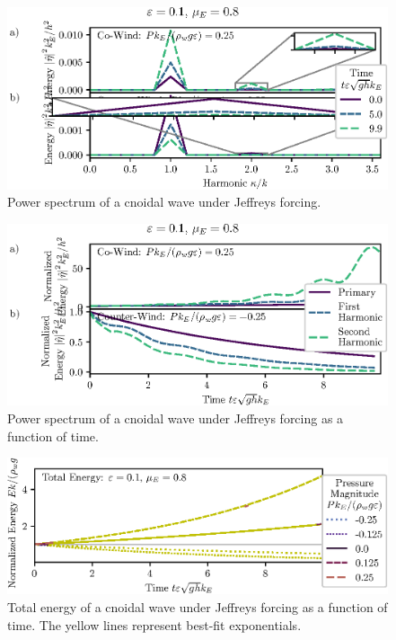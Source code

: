 \documentclass{jfm}
\begin{document}
\begin{figure}
  \centering
  \includegraphics{Power-Spectrum-Jeffreys.eps}
  \caption{
    Power spectrum of a cnoidal wave under Jeffreys forcing.
  }
\end{figure}

\begin{figure}
  \centering
  \includegraphics{Power-Spectrum-vs-Time-Jeffreys.eps}
  \caption{
    Power spectrum of a cnoidal wave under Jeffreys forcing as a function
    of time.
  }
\end{figure}

\begin{figure}
  \centering
  \includegraphics{Total-Energy-Jeffreys.eps}
  \caption{
    Total energy of a cnoidal wave under Jeffreys forcing as a function
    of time. The yellow lines represent best-fit exponentials.
  }
\end{figure}
\end{document}
